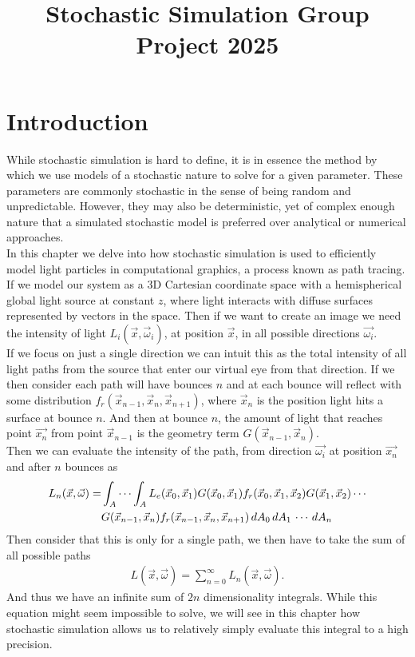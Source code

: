\documentclass{article}
\title{\vspace{-4cm}Stochastic Simulation Group Project 2025}
\begin{document}
\maketitle

\section{Introduction}
While stochastic simulation is hard to define, it is in essence the method by which
we use models of a stochastic nature to solve for a given parameter. 
These parameters are commonly stochastic in the sense of being random 
and unpredictable. However, they may also be deterministic, yet of complex enough nature
that a simulated stochastic model is preferred over analytical or numerical approaches.
\\
In this chapter we delve into how stochastic simulation is used to efficiently model
light particles in computational graphics, a process known as path tracing.
\\
If we model our system as a 3D Cartesian coordinate space with a hemispherical 
global light source at constant $z$, where light interacts with diffuse surfaces 
represented by vectors in the space. 
Then if we want to create an image we need the intensity of light 
$L_{i}(\vec{x},\vec{\omega}_i)$,
at position $\vec{x}$, in all possible directions $\vec{\omega_{i}}$.
\\
If we focus on just a single direction we can intuit this as the total intensity of all 
light paths from the source that enter our virtual eye from that direction. If we 
then consider each path will have bounces $n$ and at each bounce will reflect 
with some distribution $f_{r}(\vec{x}_{n-1},\vec{x}_{n},\vec{x}_{n+1})$,
where $\vec{x}_{n}$ is the position light hits a surface at bounce $n$. And 
then at bounce $n$, the amount of light that reaches point $\vec{x_{n}}$
from point $\vec{x}_{n-1}$ is the geometry term $G(\vec{x}_{n-1},\vec{x}_n)$.
\\
Then we can evaluate the intensity of the path, from direction $\vec{\omega_{i}}$
at position $\vec{x_{n}}$ and after $n$ bounces as
\begin{align}
    L_n(\vec{x}, \vec{\omega}) = 
    &\int_A \cdots \int_A L_e(\vec{x}_0, \vec{x}_1) 
    G(\vec{x}_0, \vec{x}_1) f_r(\vec{x}_0, \vec{x}_1, 
    \vec{x}_2) G(\vec{x}_1, \vec{x}_2) \cdots \\
    &G(\vec{x}_{n-1}, \vec{x}_n) f_r(\vec{x}_{n-1}, \vec{x}_n, \vec{x}_{n+1}) \notag
    \, dA_0 \, dA_1 \, \cdots \, dA_n
\end{align}
Then consider that this is only for a single path, we then have to take the sum of 
all possible paths
\begin{align}
    L(\vec{x},\vec{\omega}) = \sum_{n=0}^{\infty}L_n(\vec{x},\vec{\omega}).
\end{align}
And thus we have an infinite sum of $2n$ dimensionality integrals.
While this equation might seem impossible to solve, we will see in this chapter how
stochastic simulation allows us to relatively simply evaluate this integral to a high
precision. \cite{KajiyaJamesT.1986Tre} 
\end{document}
